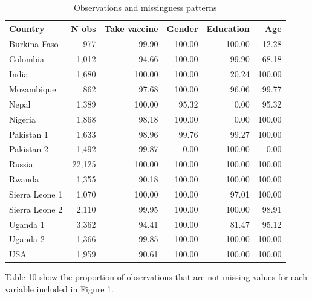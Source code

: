 \documentclass[
  12pt,
]{article}
\begin{document}
\begin{table}

\caption{Observations and missingness patterns}
\centering
\fontsize{10}{12}\selectfont
\begin{threeparttable}
\begin{tabular}[t]{lrrrrr}
\toprule
Country & N obs & Take vaccine & Gender & Education & Age\\
\midrule
Burkina Faso & 977 & 99.90 & 100.00 & 100.00 & 12.28\\
Colombia & 1,012 & 94.66 & 100.00 & 99.90 & 68.18\\
India & 1,680 & 100.00 & 100.00 & 20.24 & 100.00\\
Mozambique & 862 & 97.68 & 100.00 & 96.06 & 99.77\\
Nepal & 1,389 & 100.00 & 95.32 & 0.00 & 95.32\\
Nigeria & 1,868 & 98.18 & 100.00 & 0.00 & 100.00\\
Pakistan 1 & 1,633 & 98.96 & 99.76 & 99.27 & 100.00\\
Pakistan 2 & 1,492 & 99.87 & 0.00 & 100.00 & 0.00\\
Russia & 22,125 & 100.00 & 100.00 & 100.00 & 100.00\\
Rwanda & 1,355 & 90.18 & 100.00 & 100.00 & 100.00\\
Sierra Leone 1 & 1,070 & 100.00 & 100.00 & 97.01 & 100.00\\
Sierra Leone 2 & 2,110 & 99.95 & 100.00 & 100.00 & 98.91\\
Uganda 1 & 3,362 & 94.41 & 100.00 & 81.47 & 95.12\\
Uganda 2 & 1,366 & 99.85 & 100.00 & 100.00 & 100.00\\
USA & 1,959 & 90.61 & 100.00 & 100.00 & 100.00\\
\bottomrule
\end{tabular}
\begin{tablenotes}
\item Table 10 show the proportion of observations that are not missing values for each variable included in Figure 1.
\end{tablenotes}
\end{threeparttable}
\end{table}

\newpage
\end{document}
